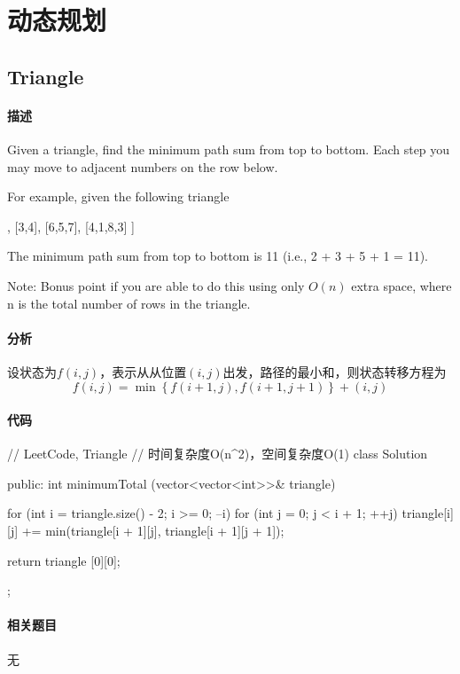 \chapter{动态规划}


\section{Triangle} %
\label{sec:triangle}


\subsubsection{描述}
Given a triangle, find the minimum path sum from top to bottom. Each step you may move to adjacent numbers on the row below.

For example, given the following triangle
\begin{Code}
[
     [2],
    [3,4],
   [6,5,7],
  [4,1,8,3]
]
\end{Code}
The minimum path sum from top to bottom is 11 (i.e., 2 + 3 + 5 + 1 = 11).

Note: Bonus point if you are able to do this using only $O(n)$ extra space, where n is the total number of rows in the triangle.


\subsubsection{分析}
设状态为$f(i, j)$，表示从从位置$(i,j)$出发，路径的最小和，则状态转移方程为
$$
f(i,j)=\min\left\{f(i+1,j),f(i+1,j+1)\right\}+(i,j)
$$


\subsubsection{代码}
\begin{Code}
// LeetCode, Triangle
// 时间复杂度O(n^2)，空间复杂度O(1)
class Solution {
public:
    int minimumTotal (vector<vector<int>>& triangle) {
        for (int i = triangle.size() - 2; i >= 0; --i)
            for (int j = 0; j < i + 1; ++j)
                triangle[i][j] += min(triangle[i + 1][j],
                        triangle[i + 1][j + 1]);

        return triangle [0][0];
    }
};
\end{Code}


\subsubsection{相关题目}
\begindot
\item 无
\myenddot



